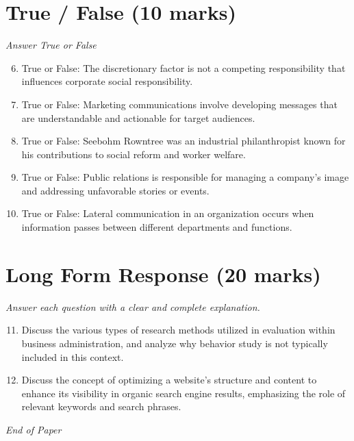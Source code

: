 \documentclass[12pt]{article}
\begin{document}
\section*{True / False (10 marks)}
\textit{Answer True or False}
\begin{enumerate}[label=\arabic*.]
\setcounter{enumi}{5}
\item True or False: The discretionary factor is not a competing responsibility that influences corporate social responsibility.
\item True or False: Marketing communications involve developing messages that are understandable and actionable for target audiences.
\item True or False: Seebohm Rowntree was an industrial philanthropist known for his contributions to social reform and worker welfare.
\item True or False: Public relations is responsible for managing a company's image and addressing unfavorable stories or events.
\item True or False: Lateral communication in an organization occurs when information passes between different departments and functions.
\end{enumerate}

\section*{Long Form Response (20 marks)}
\textit{Answer each question with a clear and complete explanation.}
\begin{enumerate}[label=\arabic*.]
\setcounter{enumi}{10}
\item Discuss the various types of research methods utilized in evaluation within business administration, and analyze why behavior study is not typically included in this context.
\item Discuss the concept of optimizing a website's structure and content to enhance its visibility in organic search engine results, emphasizing the role of relevant keywords and search phrases.
\end{enumerate}

\vfill
\noindent\textit{End of Paper}
\end{document}
